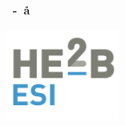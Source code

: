 
\thispagestyle{empty}

\begin{center}
	\vspace*{3cm}
	{\bf\Huge \cours}\\[1em]
	{\bf\Huge \sscours}\\[1em]
	{\bf\Large \ue ~-~\aa}\\[3em]
	\annee
\end{center}

\begin{flushright}
	\auteur
\end{flushright}


\vfill

\begin{center}
	\includegraphics[height=8em]{images/esi-logo}\\[1em]
	\ecole\\[.4em]
	\entite\\[.4em]
	\etude\\[.7em]
	\entiteadresse\\ 
	\entitetel\\
	\entitemail
\end{center}
